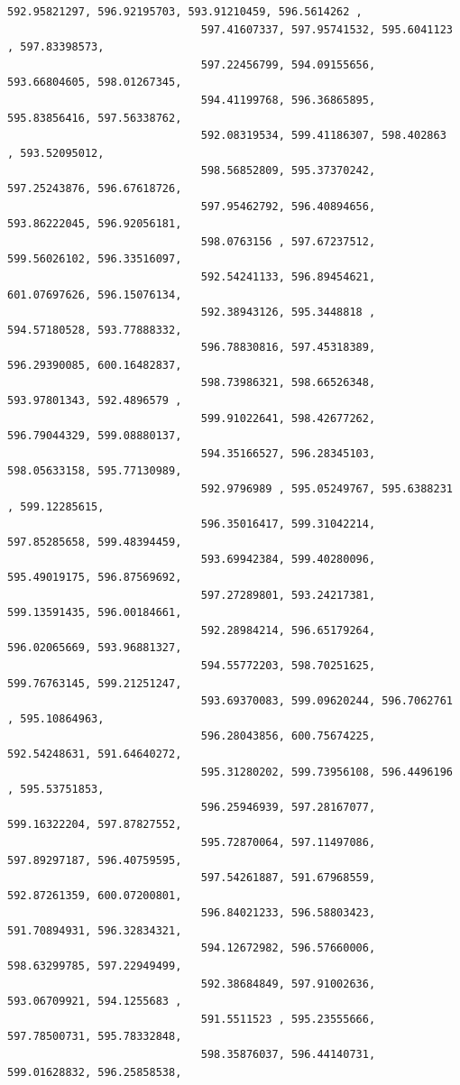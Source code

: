 \documentclass[11pt]{article}
\begin{document}
\begin{Verbatim}[commandchars=\\\{\}]
                              592.95821297, 596.92195703, 593.91210459, 596.5614262 ,
                              597.41607337, 597.95741532, 595.6041123 , 597.83398573,
                              597.22456799, 594.09155656, 593.66804605, 598.01267345,
                              594.41199768, 596.36865895, 595.83856416, 597.56338762,
                              592.08319534, 599.41186307, 598.402863  , 593.52095012,
                              598.56852809, 595.37370242, 597.25243876, 596.67618726,
                              597.95462792, 596.40894656, 593.86222045, 596.92056181,
                              598.0763156 , 597.67237512, 599.56026102, 596.33516097,
                              592.54241133, 596.89454621, 601.07697626, 596.15076134,
                              592.38943126, 595.3448818 , 594.57180528, 593.77888332,
                              596.78830816, 597.45318389, 596.29390085, 600.16482837,
                              598.73986321, 598.66526348, 593.97801343, 592.4896579 ,
                              599.91022641, 598.42677262, 596.79044329, 599.08880137,
                              594.35166527, 596.28345103, 598.05633158, 595.77130989,
                              592.9796989 , 595.05249767, 595.6388231 , 599.12285615,
                              596.35016417, 599.31042214, 597.85285658, 599.48394459,
                              593.69942384, 599.40280096, 595.49019175, 596.87569692,
                              597.27289801, 593.24217381, 599.13591435, 596.00184661,
                              592.28984214, 596.65179264, 596.02065669, 593.96881327,
                              594.55772203, 598.70251625, 599.76763145, 599.21251247,
                              593.69370083, 599.09620244, 596.7062761 , 595.10864963,
                              596.28043856, 600.75674225, 592.54248631, 591.64640272,
                              595.31280202, 599.73956108, 596.4496196 , 595.53751853,
                              596.25946939, 597.28167077, 599.16322204, 597.87827552,
                              595.72870064, 597.11497086, 597.89297187, 596.40759595,
                              597.54261887, 591.67968559, 592.87261359, 600.07200801,
                              596.84021233, 596.58803423, 591.70894931, 596.32834321,
                              594.12672982, 596.57660006, 598.63299785, 597.22949499,
                              592.38684849, 597.91002636, 593.06709921, 594.1255683 ,
                              591.5511523 , 595.23555666, 597.78500731, 595.78332848,
                              598.35876037, 596.44140731, 599.01628832, 596.25858538,

\end{Verbatim}
\end{document}
